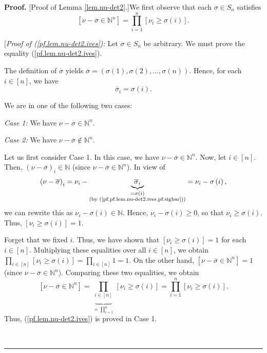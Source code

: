 \documentclass
[numbers=enddot,12pt,final,onecolumn,notitlepage,english]{scrartcl}%
\theoremstyle{definition}
\newenvironment{proof}[1][Proof]{\noindent\textbf{#1.} }{\ \rule{0.5em}{0.5em}}
\let\prodnonlimits\prod
\renewcommand{\prod}{\prodnonlimits\limits}
\newenvironment{verlong}{}{}
\begin{document}
\begin{verlong}
\begin{proof}
[Proof of Lemma \ref{lem.nu-det2}.]We first observe that each $\sigma\in
S_{n}$ satisfies%
\begin{equation}
\left[  \nu-\overline{\sigma}\in\mathbb{N}^{n}\right]  =\prod_{i=1}^{n}\left[
\nu_{i}\geq\sigma\left(  i\right)  \right]  . \label{pf.lem.nu-det2.ives}%
\end{equation}


[\textit{Proof of (\ref{pf.lem.nu-det2.ives}):} Let $\sigma\in S_{n}$ be
arbitrary. We must prove the equality (\ref{pf.lem.nu-det2.ives}).

The definition of $\overline{\sigma}$ yields $\overline{\sigma}=\left(
\sigma\left(  1\right)  ,\sigma\left(  2\right)  ,\ldots,\sigma\left(
n\right)  \right)  $. Hence, for each $i\in\left[  n\right]  $, we have%
\begin{equation}
\overline{\sigma}_{i}=\sigma\left(  i\right)  .
\label{pf.pf.lem.nu-det2.ives.pf.sigbar}%
\end{equation}


We are in one of the following two cases:

\textit{Case 1:} We have $\nu-\overline{\sigma}\in\mathbb{N}^{n}$.

\textit{Case 2:} We have $\nu-\overline{\sigma}\notin\mathbb{N}^{n}$. \medskip

Let us first consider Case 1. In this case, we have $\nu-\overline{\sigma}%
\in\mathbb{N}^{n}$. Now, let $i\in\left[  n\right]  $. Then, $\left(
\nu-\overline{\sigma}\right)  _{i}\in\mathbb{N}$ (since $\nu-\overline{\sigma
}\in\mathbb{N}^{n}$). In view of
\[
\left(  \nu-\overline{\sigma}\right)  _{i}=\nu_{i}-\underbrace{\overline
{\sigma}_{i}}_{\substack{=\sigma\left(  i\right)  \\\text{(by
(\ref{pf.pf.lem.nu-det2.ives.pf.sigbar}))}}}=\nu_{i}-\sigma\left(  i\right)
,
\]
we can rewrite this as $\nu_{i}-\sigma\left(  i\right)  \in\mathbb{N}$. Hence,
$\nu_{i}-\sigma\left(  i\right)  \geq0$, so that $\nu_{i}\geq\sigma\left(
i\right)  $. Thus, $\left[  \nu_{i}\geq\sigma\left(  i\right)  \right]  =1$.

Forget that we fixed $i$. Thus, we have shown that $\left[  \nu_{i}\geq
\sigma\left(  i\right)  \right]  =1$ for each $i\in\left[  n\right]  $.
Multiplying these equalities over all $i\in\left[  n\right]  $, we obtain
$\prod_{i\in\left[  n\right]  }\left[  \nu_{i}\geq\sigma\left(  i\right)
\right]  =\prod_{i\in\left[  n\right]  }1=1$. On the other hand, $\left[
\nu-\overline{\sigma}\in\mathbb{N}^{n}\right]  =1$ (since $\nu-\overline
{\sigma}\in\mathbb{N}^{n}$). Comparing these two equalities, we obtain%
\[
\left[  \nu-\overline{\sigma}\in\mathbb{N}^{n}\right]  =\underbrace{\prod
_{i\in\left[  n\right]  }}_{=\prod_{i=1}^{n}}\left[  \nu_{i}\geq\sigma\left(
i\right)  \right]  =\prod_{i=1}^{n}\left[  \nu_{i}\geq\sigma\left(  i\right)
\right]  .
\]
Thus, (\ref{pf.lem.nu-det2.ives}) is proved in Case 1. \medskip


\end{proof}
\end{verlong}
\end{document}

